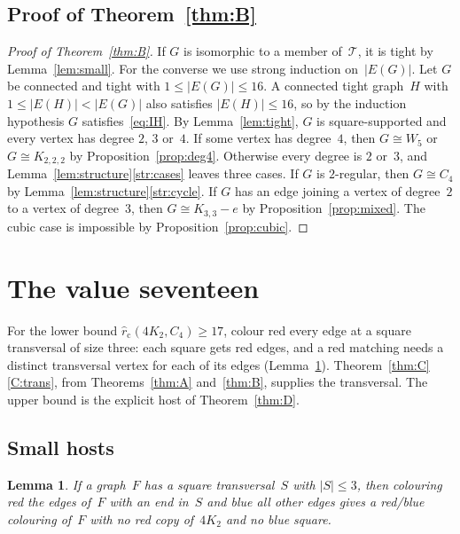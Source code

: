 \documentclass[11pt,letterpaper]{article}
\numberwithin{equation}{section}
\theoremstyle{plain}
\newtheorem{lemma}[theorem]{Lemma}
\theoremstyle{definition}
\theoremstyle{remark}
\newcommand{\Kme}{K_{3,3}-e}
\newcommand{\Oct}{K_{2,2,2}}
\newcommand{\rc}{\hat r_{\mathrm{c}}}
\newcommand{\Tfam}{\mathcal{T}}
\begin{document}
\subsection{Proof of Theorem~\ref*{thm:B}}

\begin{proof}[Proof of Theorem~\ref{thm:B}]
If $G$ is isomorphic to a member of~$\Tfam$, it is tight by Lemma~\ref{lem:small}. For the converse we use strong induction on~$|E(G)|$. Let $G$ be connected and tight with $1\le|E(G)|\le16$. A connected tight graph~$H$ with $1\le|E(H)|<|E(G)|$ also satisfies $|E(H)|\le16$, so by the induction hypothesis $G$ satisfies~\eqref{eq:IH}. By Lemma~\ref{lem:tight}, $G$ is square-supported and every vertex has degree $2$, $3$ or~$4$. If some vertex has degree~$4$, then $G\cong W_5$ or $G\cong\Oct$ by Proposition~\ref{prop:deg4}. Otherwise every degree is $2$ or~$3$, and Lemma~\ref{lem:structure}\ref{str:cases} leaves three cases. If $G$ is $2$-regular, then $G\cong C_4$ by Lemma~\ref{lem:structure}\ref{str:cycle}. If $G$ has an edge joining a vertex of degree~$2$ to a vertex of degree~$3$, then $G\cong\Kme$ by Proposition~\ref{prop:mixed}. The cubic case is impossible by Proposition~\ref{prop:cubic}.
\end{proof}

\section{The value seventeen}\label{sec:CDE}

For the lower bound $\rc(4K_2,C_4)\ge17$, colour red every edge at a square transversal of size three: each square gets red edges, and a red matching needs a distinct transversal vertex for each of its edges (Lemma~\ref{lem:colouring}). Theorem~\ref{thm:C}\ref{C:trans}, from Theorems~\ref{thm:A} and~\ref{thm:B}, supplies the transversal. The upper bound is the explicit host of Theorem~\ref{thm:D}.

\subsection{Small hosts}

\begin{lemma}\label{lem:colouring}
If a graph~$F$ has a square transversal~$S$ with $|S|\le3$, then colouring red the edges of~$F$ with an end in~$S$ and blue all other edges gives a red/blue colouring of~$F$ with no red copy of~$4K_2$ and no blue square.
\end{lemma}
\end{document}

